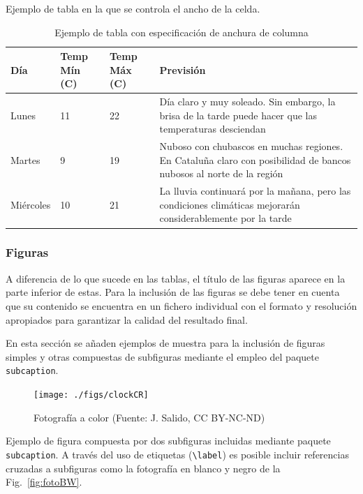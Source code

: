 \noindent Ejemplo de tabla en la que se 
controla el ancho de la celda.

\begin{table}[H]%
	\centering
	\caption{Ejemplo de tabla con especificación de anchura de columna}
	\label{tab:anchura}
	\begin{tabular}{ | l | l | l | p{5cm} |}
		\hline
		Día & Temp Mín (\textdegree C) & Temp Máx (\textdegree C) & Previsión \\ \hline
		Lunes & 11 & 22 & Día claro y muy soleado. Sin embargo, la brisa de la tarde puede hacer que las temperaturas desciendan \\ \hline
		Martes & 9 & 19 & Nuboso con chubascos en muchas regiones. En Cataluña claro con posibilidad de bancos nubosos al norte de la región \\ \hline
		Miércoles & 10 & 21 & La lluvia continuará por la mañana, pero las 
		condiciones climáticas mejorarán considerablemente por la tarde\\
		\hline
	\end{tabular}
\end{table}






\newpage %
\subsubsection{Figuras}
A diferencia de lo que sucede en las tablas, el título de las figuras aparece en la parte inferior de estas. Para la inclusión de las figuras se debe tener en cuenta que su contenido se encuentra en un fichero individual con el formato y resolución apropiados para garantizar la calidad del resultado final.

En esta sección se añaden ejemplos de muestra para la inclusión de 
figuras simples y otras compuestas de subfiguras mediante el empleo del paquete \texttt{subcaption}.

\begin{figure}[H] %
	\centering
	\texttt{[image: ./figs/clockCR]}
	\caption[Ejemplo de figura]{Fotografía a color 
	(Fuente: J. Salido, CC BY-NC-ND)}
	\label{fig:ejFigure}
\end{figure}


\noindent Ejemplo de figura compuesta por dos subfiguras incluidas mediante paquete \texttt{subcaption}. A través del uso de etiquetas (\texttt{\textbackslash label}) es posible incluir referencias cruzadas a subfiguras como la fotografía en blanco y negro de la Fig.~\ref{fig:fotoBW}.


